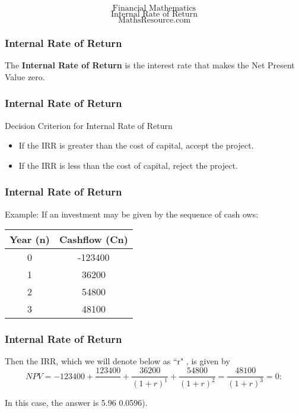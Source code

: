 \begin{frame}
\Large
{
\Huge
\[ \mbox{ Financial Mathematics } \]
}
{
\LARGE
\[ \mbox{ Internal Rate of Return } \]
}
\bigskip
{
\Large
\[ \mbox{ MathsResource.com } \]
}
\end{frame}
\begin{frame}
\frametitle{Internal Rate of Return}
\Large

The \textbf{Internal Rate of Return} is the interest rate that makes the Net Present Value zero.


\end{frame}
\begin{frame}
\frametitle{Internal Rate of Return}
\Large

Decision Criterion for Internal Rate of Return
\begin{itemize}
\item If the IRR is greater than the cost of capital,
accept the project.
\item If the IRR is less than the cost of capital, reject
the project.
\end{itemize}

\end{frame}
\begin{frame}
\frametitle{Internal Rate of Return}
\Large

Example: If an investment may be given by the
sequence of cash 
ows:
\begin{center}
\begin{tabular}{|c|c|}
Year (n) & Cashflow (Cn) \\ \hline
0 & -123400 \\
1 & 36200 \\
2 & 54800 \\
3 & 48100 \\ \hline
\end{tabular}
\end{center}

\end{frame}
\begin{frame}
\frametitle{Internal Rate of Return}
\Large


Then the IRR, which we will denote below as ``r" , is given by
\[ NPV = -123400 + \frac{123400}{}  + \frac{36200}{(1+r)^1} + \frac{54800}{(1 + r )^2} = \frac{48100}{(1 + r )^3} = 0:
\]

In this case, the answer is 5.96%
0.0596).

\end{frame}

